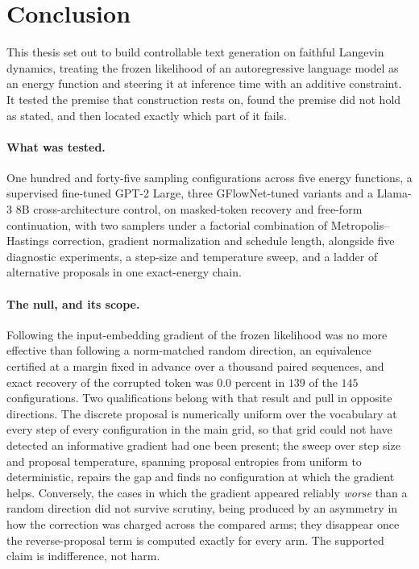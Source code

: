 \section{Conclusion}
\label{ch:conclusion}

This thesis set out to build controllable text generation on faithful Langevin dynamics, treating the frozen likelihood of an autoregressive language model as an energy function and steering it at inference time with an additive constraint. It tested the premise that construction rests on, found the premise did not hold as stated, and then located exactly which part of it fails.

\paragraph*{What was tested.} One hundred and forty-five sampling configurations across five energy functions, a supervised fine-tuned GPT-2 Large, three GFlowNet-tuned variants and a Llama-3 8B cross-architecture control, on masked-token recovery and free-form continuation, with two samplers under a factorial combination of Metropolis--Hastings correction, gradient normalization and schedule length, alongside five diagnostic experiments, a step-size and temperature sweep, and a ladder of alternative proposals in one exact-energy chain.

\paragraph*{The null, and its scope.} Following the input-embedding gradient of the frozen likelihood was no more effective than following a norm-matched random direction, an equivalence certified at a margin fixed in advance over a thousand paired sequences, and exact recovery of the corrupted token was $0.0$ percent in $139$ of the $145$ configurations. Two qualifications belong with that result and pull in opposite directions. The discrete proposal is numerically uniform over the vocabulary at every step of every configuration in the main grid, so that grid could not have detected an informative gradient had one been present; the sweep over step size and proposal temperature, spanning proposal entropies from uniform to deterministic, repairs the gap and finds no configuration at which the gradient helps. Conversely, the cases in which the gradient appeared reliably \emph{worse} than a random direction did not survive scrutiny, being produced by an asymmetry in how the correction was charged across the compared arms; they disappear once the reverse-proposal term is computed exactly for every arm. The supported claim is indifference, not harm.

